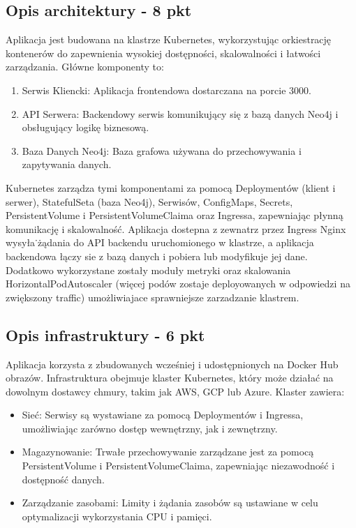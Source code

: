\documentclass[12pt,a4paper]{article}
\begin{document}
\subsection{Opis architektury - 8 pkt}
\label{sec:introduction}
Aplikacja jest budowana na klastrze Kubernetes, wykorzystując orkiestrację kontenerów do zapewnienia wysokiej dostępności, skalowalności i łatwości zarządzania. Główne komponenty to:
\begin{enumerate}
    \item Serwis Kliencki: Aplikacja frontendowa dostarczana na porcie 3000.
    \item API Serwera: Backendowy serwis komunikujący się z bazą danych Neo4j i obsługujący logikę biznesową.
    \item Baza Danych Neo4j: Baza grafowa używana do przechowywania i zapytywania danych.
\end{enumerate}
Kubernetes zarządza tymi komponentami za pomocą Deploymentów (klient i serwer), StatefulSeta (baza Neo4j), Serwisów, ConfigMaps, Secrets, PersistentVolume i PersistentVolumeClaima oraz Ingressa, zapewniając płynną komunikację i skalowalność. Aplikacja dostepna z zewnatrz przez Ingress Nginx wysyła˙żądania do API backendu uruchomionego w klastrze, a aplikacja backendowa łączy sie z bazą danych i pobiera lub modyfikuje jej dane. Dodatkowo wykorzystane zostały moduły metryki oraz skalowania HorizontalPodAutoscaler (więcej podów zostaje deployowanych w odpowiedzi na zwiększony traffic) umożliwiajace sprawniejsze zarzadzanie klastrem.



\subsection{Opis infrastruktury - 6 pkt}
\label{sec:Users}
Aplikacja korzysta z zbudowanych wcześniej i udostępnionych na Docker Hub obrazów. Infrastruktura obejmuje klaster Kubernetes, który może działać na dowolnym dostawcy chmury, takim jak AWS, GCP lub Azure. Klaster zawiera:
\begin{itemize}
    \item Sieć: Serwisy są wystawiane za pomocą Deploymentów i Ingressa, umożliwiając zarówno dostęp wewnętrzny, jak i zewnętrzny.
    \item Magazynowanie: Trwałe przechowywanie zarządzane jest za pomocą PersistentVolume i PersistentVolumeClaima, zapewniając niezawodność i dostępność danych.
    \item Zarządzanie zasobami: Limity i żądania zasobów są ustawiane w celu optymalizacji wykorzystania CPU i pamięci.
\end{itemize}
\end{document}
